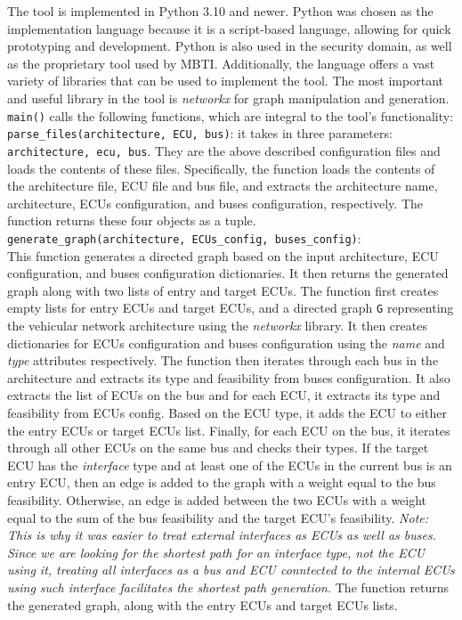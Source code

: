 The tool is implemented in Python 3.10 and newer.
Python was chosen as the implementation language because it is a script-based language, allowing for quick prototyping and development.
Python is also used in the security domain, as well as the proprietary tool used by MBTI.
Additionally, the language offers a vast variety of libraries that can be used to implement the tool.
The most important and useful library in the tool is \textit{networkx} for graph manipulation and generation.\\

\texttt{main()} calls the following functions, which are integral to the tool's functionality:\\

\texttt{parse\_files(architecture, ECU, bus)}: it takes in three parameters: \texttt{architecture, ecu, bus}.
They are the above described configuration files and loads the contents of these files. 
Specifically, the function loads the contents of the architecture file, ECU file and bus file, 
and extracts the architecture name, architecture, ECUs configuration, and buses configuration, respectively. 
The function returns these four objects as a tuple.\\

\texttt{generate\_graph(architecture, ECUs\_config, buses\_config)}:\\
This function generates a directed graph based on the input architecture, ECU configuration, and buses configuration dictionaries. 
It then returns the generated graph along with two lists of entry and target ECUs.
The function first creates empty lists for entry ECUs and target ECUs, and a directed graph \texttt{G} representing 
the vehicular network architecture using the \textit{networkx} library. 
It then creates dictionaries for ECUs configuration and buses configuration using the \textit{name} and \textit{type} attributes respectively.
The function then iterates through each bus in the architecture and extracts its type and feasibility from buses configuration. 
It also extracts the list of ECUs on the bus and for each ECU, it extracts its type and feasibility from ECUs config. 
Based on the ECU type, it adds the ECU to either the entry ECUs or target ECUs list.
Finally, for each ECU on the bus, it iterates through all other ECUs on the same bus and checks their types. 
If the target ECU has the \textit{interface} type and at least one of the ECUs in the current bus is an entry ECU, 
then an edge is added to the graph with a weight equal to the bus feasibility. 
Otherwise, an edge is added between the two ECUs with a weight equal to the sum of the bus feasibility and the target ECU's feasibility.
\textit{Note: This is why it was easier to treat external interfaces as ECUs as well as buses.
Since we are looking for the shortest path for an interface type, not the ECU using it, treating all interfaces
as a bus and ECU conntected to the internal ECUs using such interface facilitates the shortest path generation.}
The function returns the generated graph, along with the entry ECUs and target ECUs lists.\\

